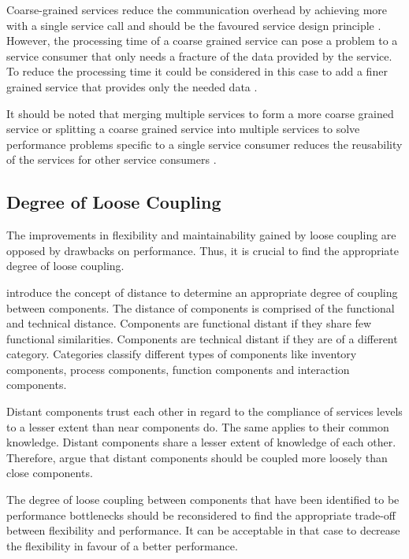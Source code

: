Coarse-grained services reduce the communication overhead by achieving more with a single service call and should be the favoured service design principle \citep{Hess:2006rs}. However, the processing time of a coarse grained service can pose a problem to a service consumer that only needs a fracture of the data provided by the service. To reduce the processing time it could be considered in this case to add a finer grained service that provides only the needed data \citep{Josuttis:2007fk}. 

It should be noted that merging multiple services to form a more coarse grained service or splitting a coarse grained service into multiple services to solve performance problems specific to a single service consumer reduces the reusability of the services for other service consumers \citep{Josuttis:2007fk}.
\subsection{Degree of Loose Coupling}
The improvements in flexibility and maintainability gained by loose coupling are opposed by drawbacks on performance. Thus, it is crucial to find the appropriate degree of loose coupling. 

\citet{Hess:2006rs} introduce the concept of distance to determine an appropriate degree of coupling between components. The distance of components is comprised of the functional and technical distance. Components are functional distant if they share few functional similarities. Components are technical distant if they are of a different category. Categories classify different types of components like inventory components, process components, function components and interaction components.

Distant components trust each other in regard to the compliance of services levels to a lesser extent than near components do. The same applies to their common knowledge. Distant components share a lesser extent of knowledge of each other. Therefore, \citet{Hess:2006rs} argue that distant components should be coupled more loosely than close components.

The degree of loose coupling between components that have been identified to be performance bottlenecks should be reconsidered to find the appropriate trade-off between flexibility and performance. It can be acceptable in that case to decrease the flexibility in favour of a better performance. 

